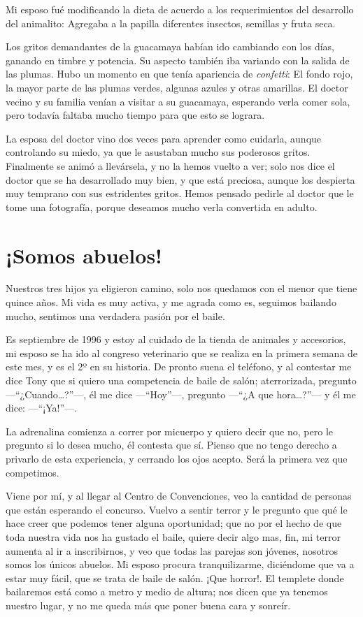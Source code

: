 \documentclass[letterpaper, 12pt]{book}
\begin{document}
Mi esposo fué modificando la dieta de acuerdo a los requerimientos del desarrollo del animalito: Agregaba a la papilla diferentes insectos, semillas y fruta seca. 

Los gritos demandantes de la guacamaya habían ido cambiando con los días, ganando en timbre y potencia. Su aspecto también iba variando con la salida de las plumas. Hubo un momento en que tenía apariencia de \textit{confetti}: El fondo rojo, la mayor parte de las plumas verdes, algunas azules y otras amarillas. El doctor vecino y su familia venían a visitar a su guacamaya, esperando verla comer sola, pero todavía faltaba mucho tiempo para que esto se lograra. 

La esposa del doctor vino dos veces para aprender como cuidarla, aunque controlando su miedo, ya que le asustaban mucho sus poderosos gritos. Finalmente se animó a llevársela, y no la hemos vuelto a ver; solo nos dice el doctor que se ha desarrollado muy bien, y que está preciosa, aunque los despierta muy temprano con sus estridentes gritos. Hemos pensado pedirle al doctor que le tome una fotografía, porque deseamos mucho verla convertida en adulto.

\chapter{¡Somos abuelos!}
Nuestros tres hijos ya eligieron camino, solo nos quedamos con el menor que tiene quince años. Mi vida es muy activa, y me agrada como es, seguimos bailando mucho, sentimos una verdadera pasión por el baile.  

Es septiembre de 1996 y estoy al cuidado de la tienda de animales y accesorios, mi esposo se ha ido al congreso veterinario que se realiza en la primera semana de este mes, y es el 2º en su historia. De pronto suena el teléfono, y al contestar me dice Tony que si quiero una competencia de baile de salón; aterrorizada, pregunto ---``¿Cuando\ldots?''---, él me dice ---``Hoy''---, pregunto ---``¿A que hora\ldots?''--- y él me dice: ---``¡Ya!''---.

La adrenalina comienza a correr por micuerpo y quiero decir que no, pero le pregunto si lo desea mucho, él contesta que sí. Pienso que no tengo derecho a privarlo de esta experiencia, y cerrando los ojos acepto. Será la primera vez que competimos.

Viene por mí, y al llegar al Centro de Convenciones, veo la cantidad de personas que están esperando el concurso. Vuelvo a sentir terror y le pregunto que qué le hace creer que podemos tener alguna oportunidad; que no por el hecho de que toda nuestra vida nos ha gustado el baile, quiere decir algo mas, fin, mi terror aumenta al ir a inscribirnos, y veo que todas las parejas son jóvenes, nosotros somos los únicos abuelos. Mi esposo procura tranquilizarme, diciéndome que va a estar muy fácil, que se trata de baile de salón. ¡Que horror!. El templete donde bailaremos está como a metro y medio de altura; nos dicen que ya tenemos nuestro lugar, y no me queda más que poner buena cara y sonreír. 
\end{document}
